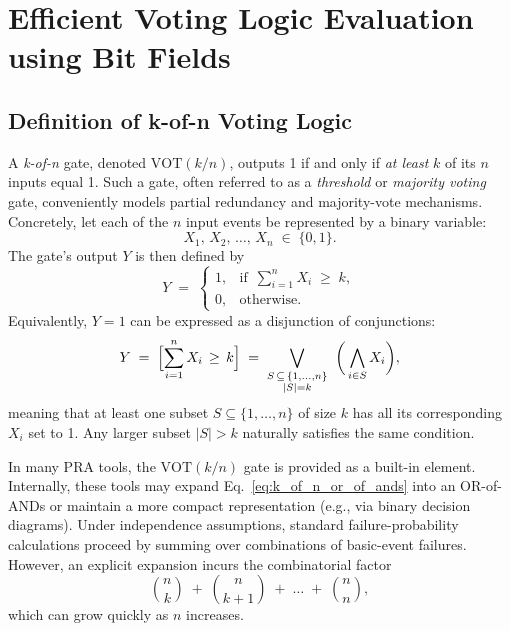 \section{Efficient Voting Logic Evaluation using Bit Fields}


\subsection{Definition of k-of-n Voting Logic}
\label{sec:kn_voting_logic_definition}

A \emph{k-of-n} gate, denoted \(\mathrm{VOT}(k/n)\), outputs 1 if and only if \emph{at least} \(k\) of its \(n\) inputs equal 1. Such a gate, often referred to as a \emph{threshold} or \emph{majority voting} gate, conveniently models partial redundancy and majority-vote mechanisms. Concretely, let each of the \(n\) input events be represented by a binary variable:
\[
X_1, \, X_2, \, \dots, \, X_n \;\in\;\{0,1\}.
\]
The gate’s output \(Y\) is then defined by
\begin{equation}
\label{eq:kn_gate_boolean}
Y 
\;=\;
\begin{cases}
1, & \text{if }\, \displaystyle\sum_{i=1}^{n} X_i \;\ge\; k,\\[4pt]
0, & \text{otherwise}.
\end{cases}
\end{equation}
Equivalently, \(Y=1\) can be expressed as a disjunction of conjunctions:
\begin{equation}
\label{eq:k_of_n_or_of_ands}
Y 
\;=\;
\Bigl[\sum_{i=1}^{n} X_i \,\ge\, k\Bigr]
\;=\;
\bigvee_{\substack{S\,\subseteq\,\{1,\dots,n\}\\|S|=k}}
\;\;\biggl(\,\bigwedge_{i\in S} X_i\biggr),
\end{equation}
meaning that at least one subset \(S\subseteq \{1,\dots,n\}\) of size \(k\) has all its corresponding \(X_i\) set to 1. Any larger subset \(\lvert S\rvert > k\) naturally satisfies the same condition.

In many PRA tools, the \(\mathrm{VOT}(k/n)\) gate is provided as a built-in element. Internally, these tools may expand Eq.~\eqref{eq:k_of_n_or_of_ands} into an OR-of-ANDs or maintain a more compact representation (e.g., via binary decision diagrams). Under independence assumptions, standard failure-probability calculations proceed by summing over combinations of basic-event failures. However, an explicit expansion incurs the combinatorial factor
\[
\binom{n}{k} \;+\; \binom{n}{k+1} \;+\; \dots \;+\; \binom{n}{n},
\]
which can grow quickly as \(n\) increases.

